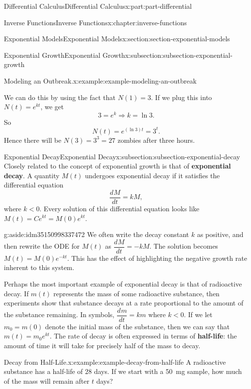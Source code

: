 \documentclass[twoside,10pt,]{tufte-book}
\newcommand{\terminology}[1]{\textbf{#1}}
\numberwithin{equation}{part}
\newcommand{\dv}[3][]{\dfrac{d^{#1} #2}{d #3^{#1}}}
\begin{document}
\begin{partptx}{Differential Calculus}{}{Differential Calculus}{}{}{x:part:part-differential}
\begin{chapterptx}{Inverse Functions}{}{Inverse Functions}{}{}{x:chapter:inverse-functions}
\begin{sectionptx}{Exponential Models}{}{Exponential Models}{}{}{x:section:section-exponential-models}
\begin{subsectionptx}{Exponential Growth}{}{Exponential Growth}{}{}{x:subsection:subsection-exponential-growth}
\begin{example}{Modeling an Outbreak.}{x:example:example-modeling-an-outbreak}
\par
We can do this by using the fact that \(N(1) = 3\). If we plug this into \(N(t) = e^{kt}\), we get%
\begin{equation*}
3 = e^{k} \Rightarrow k = \ln3.
\end{equation*}
So%
\begin{equation*}
N(t) = e^{(\ln 3)t} = 3^{t}.
\end{equation*}
Hence there will be \(N(3) = 3^{3} = 27\) zombies after three hours.%
\end{example}
\end{subsectionptx}
%
%
\typeout{************************************************}
\typeout{************************************************}
%
\begin{subsectionptx}{Exponential Decay}{}{Exponential Decay}{}{}{x:subsection:subsection-exponential-decay}
Closely related to the concept of exponential growth is that of \terminology{exponential decay}. A quantity \(M(t)\) undergoes exponential decay if it satisfies the differential equation%
\begin{equation*}
\dv{M}{t} = kM,
\end{equation*}
where \(k < 0\). Every solution of this differential equation looks like \(M(t) = Ce^{kt} = M(0)e^{kt}\).%
\begin{aside}{}{g:aside:idm35150998337472}%
We often write the decay constant \(k\) as positive, and then rewrite the ODE for \(M(t)\) as \(\dv{M}{t} = -kM\). The solution becomes \(M(t) = M(0)e^{-kt}\). This has the effect of highlighting the negative growth rate inherent to this system.%
\end{aside}
Perhaps the most important example of exponential decay is that of radioactive decay. If \(m(t)\) represents the mass of some radioactive substance, then experiments show that substance decays at a rate proportional to the amount of the substance remaining. In symbols, \(\dv{m}{t} = km\) where \(k < 0\). If we let \(m_{0} = m(0)\) denote the initial mass of the substance, then we can say that \(m(t) = m_{0}e^{kt}\). The rate of decay is often expressed in terms of \terminology{half-life}: the amount of time it will take for precisely half of the mass to decay.%
\begin{example}{Decay from Half-Life.}{x:example:example-decay-from-half-life}%
A radioactive substance has a half-life of \(28\) days. If we start with a \SI{50}{\milli\gram} sample, how much of the mass will remain after \(t\) days?%
\par\smallskip%

\end{example}
\end{subsectionptx}
\end{sectionptx}
\end{chapterptx}
\end{partptx}
\end{document}
